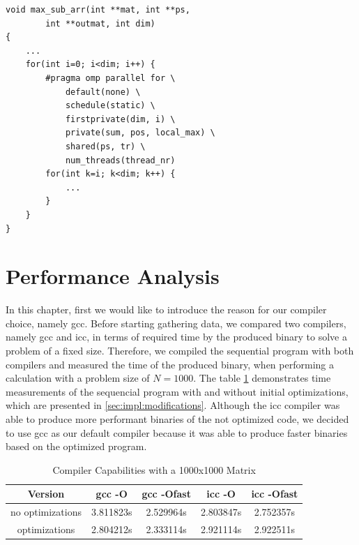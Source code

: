 \documentclass[conference]{IEEEtran}
\begin{document}
\begin{center}
   \begin{lstlisting}[captionpos=b, caption=OpenMP: Parallel Main Algorithm - Second Approach, label=lst:alg2]  
void max_sub_arr(int **mat, int **ps,                                                  
        int **outmat, int dim)                                                   
{                                                              
    ...                                        
    for(int i=0; i<dim; i++) {                                 
        #pragma omp parallel for \                             
            default(none) \                                    
            schedule(static) \                                 
            firstprivate(dim, i) \                             
            private(sum, pos, local_max) \                     
            shared(ps, tr) \                                   
            num_threads(thread_nr)                                                                                          
        for(int k=i; k<dim; k++) { 
            ...
        }
    }
}
   \end{lstlisting}
\end{center}



\section{Performance Analysis}
\label{sec:analysis}
In this chapter, first we would like to introduce the reason for our compiler choice, namely gcc. Before starting gathering data, we compared two compilers, namely gcc and icc, in terms of required time by the produced binary to solve a problem of a fixed size. Therefore, we compiled the sequential program with both compilers and measured the time of the produced binary, when performing a calculation with a problem size of $N=1000$. The table \ref{table:compiler} demonstrates time measurements of the sequencial program with and without initial optimizations, which are presented in \ref{sec:impl:modifications}. Although the icc compiler was able to produce more performant binaries of the not optimized code, we decided to use gcc as our default compiler because it was able to produce faster binaries based on the optimized program. 

\begin{table}[!t]
\renewcommand{\arraystretch}{1.3}
\caption{Compiler Capabilities with a 1000x1000 Matrix}
\label{table:compiler}
\centering
\begin{tabular}{|c||c|c|c|c|}
\hline
Version & gcc -O & gcc -Ofast & icc -O & icc -Ofast \\
\hline
no optimizations & 3.811823s & 2.529964s & 2.803847s & 2.752357s \\
\hline
optimizations & 2.804212s & 2.333114s & 2.921114s & 2.922511s \\
\hline
\end{tabular}
\end{table}
\end{document}
